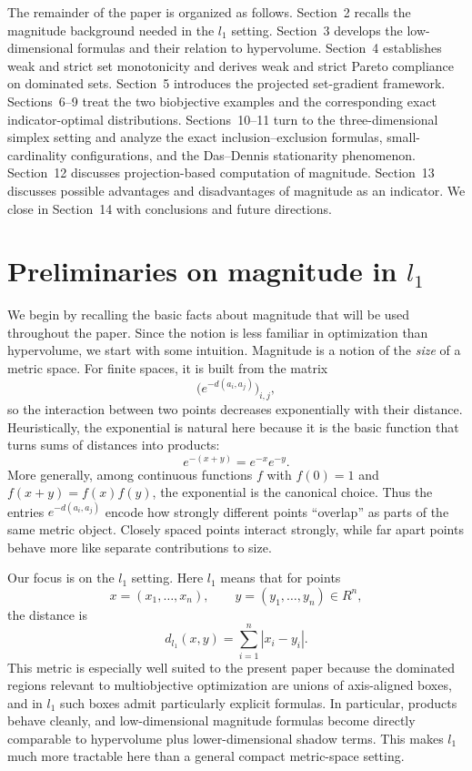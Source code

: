 \documentclass{article}
\def\ell{l}%
\def\R{R}%
\theoremstyle{definition}
\newcommand{\R}{\mathbb{R}}
\newcommand{\1}{\mathbf{1}}
\begin{document}
The remainder of the paper is organized as follows. Section~2 recalls the magnitude background needed in the $\ell_1$ setting. Section~3 develops the low-dimensional formulas and their relation to hypervolume. Section~4 establishes weak and strict set monotonicity and derives weak and strict Pareto compliance on dominated sets. Section~5 introduces the projected set-gradient framework. Sections~6--9 treat the two biobjective examples and the corresponding exact indicator-optimal distributions. Sections~10--11 turn to the three-dimensional simplex setting and analyze the exact inclusion--exclusion formulas, small-cardinality configurations, and the Das--Dennis stationarity phenomenon. Section~12 discusses projection-based computation of magnitude. Section~13 discusses possible advantages and disadvantages of magnitude as an indicator. We close in Section~14 with conclusions and future directions.

\section{Preliminaries on magnitude in \texorpdfstring{$\ell_1$}{l1}}

We begin by recalling the basic facts about magnitude that will be used throughout the paper. Since the notion is less familiar in optimization than hypervolume, we start with some intuition. Magnitude is a notion of the \emph{size} of a metric space. For finite spaces, it is built from the matrix
\[
\bigl(e^{-d(a_i,a_j)}\bigr)_{i,j},
\]
so the interaction between two points decreases exponentially with their distance. Heuristically, the exponential is natural here because it is the basic function that turns sums of distances into products:
\[
e^{-(x+y)}=e^{-x}e^{-y}.
\]
More generally, among continuous functions \(f\) with \(f(0)=1\) and \(f(x+y)=f(x)f(y)\), the exponential is the canonical choice. Thus the entries \(e^{-d(a_i,a_j)}\) encode how strongly different points ``overlap'' as parts of the same metric object. Closely spaced points interact strongly, while far apart points behave more like separate contributions to size.

Our focus is on the \(\ell_1\) setting. Here \(\ell_1\) means that for points
\[
x=(x_1,\dots,x_n),\qquad y=(y_1,\dots,y_n)\in \R^n,
\]
the distance is
\[
d_{\ell_1}(x,y)=\sum_{i=1}^n |x_i-y_i|.
\]
This metric is especially well suited to the present paper because the dominated regions relevant to multiobjective optimization are unions of axis-aligned boxes, and in \(\ell_1\) such boxes admit particularly explicit formulas. In particular, products behave cleanly, and low-dimensional magnitude formulas become directly comparable to hypervolume plus lower-dimensional shadow terms. This makes \(\ell_1\) much more tractable here than a general compact metric-space setting.
\end{document}
